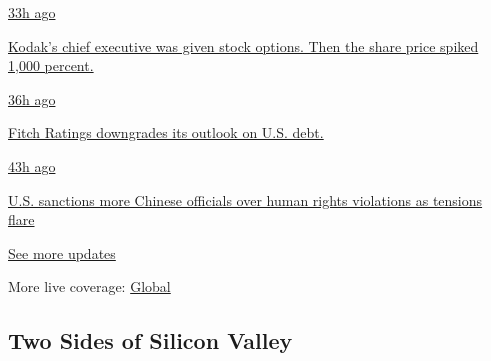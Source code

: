 \href{https://www.nytimes.com/live/2020/07/31/business/stock-market-today-coronavirus?action=click\&pgtype=Article\&state=default\&region=MAIN_CONTENT_1\&context=storylines_live_updates\#kodaks-chief-executive-was-given-stock-options-then-the-share-price-spiked-1000-percent}{33h
ago}

\href{https://www.nytimes.com/live/2020/07/31/business/stock-market-today-coronavirus?action=click\&pgtype=Article\&state=default\&region=MAIN_CONTENT_1\&context=storylines_live_updates\#kodaks-chief-executive-was-given-stock-options-then-the-share-price-spiked-1000-percent}{Kodak's
chief executive was given stock options. Then the share price spiked
1,000 percent.}

\href{https://www.nytimes.com/live/2020/07/31/business/stock-market-today-coronavirus?action=click\&pgtype=Article\&state=default\&region=MAIN_CONTENT_1\&context=storylines_live_updates\#fitch-ratings-downgrades-its-outlook-on-us-debt}{36h
ago}

\href{https://www.nytimes.com/live/2020/07/31/business/stock-market-today-coronavirus?action=click\&pgtype=Article\&state=default\&region=MAIN_CONTENT_1\&context=storylines_live_updates\#fitch-ratings-downgrades-its-outlook-on-us-debt}{Fitch
Ratings downgrades its outlook on U.S. debt.}

\href{https://www.nytimes.com/live/2020/07/31/business/stock-market-today-coronavirus?action=click\&pgtype=Article\&state=default\&region=MAIN_CONTENT_1\&context=storylines_live_updates\#us-sanctions-more-chinese-officials-over-human-rights-violations-as-tensions-flare}{43h
ago}

\href{https://www.nytimes.com/live/2020/07/31/business/stock-market-today-coronavirus?action=click\&pgtype=Article\&state=default\&region=MAIN_CONTENT_1\&context=storylines_live_updates\#us-sanctions-more-chinese-officials-over-human-rights-violations-as-tensions-flare}{U.S.
sanctions more Chinese officials over human rights violations as
tensions flare}

\href{https://www.nytimes.com/live/2020/07/31/business/stock-market-today-coronavirus?action=click\&pgtype=Article\&state=default\&region=MAIN_CONTENT_1\&context=storylines_live_updates}{See
more updates}

More live coverage:
\href{https://www.nytimes.com/2020/08/01/world/coronavirus-covid-19.html?action=click\&pgtype=Article\&state=default\&region=MAIN_CONTENT_1\&context=storylines_live_updates}{Global}

\hypertarget{two-sides-of-silicon-valley}{%
\subsection{Two Sides of Silicon
Valley}\label{two-sides-of-silicon-valley}}

